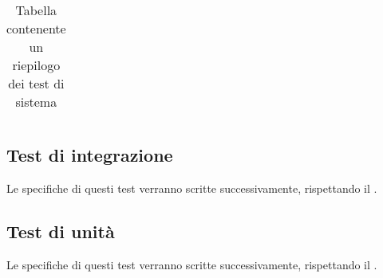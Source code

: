 \begin{center}
\begin{longtable}{|c|p{10cm}|c|}
			 \caption{Tabella contenente un riepilogo dei test di sistema}
			\end{longtable}
		\end{center}


	\subsection{Test di integrazione}
		Le specifiche di questi test verranno scritte successivamente, rispettando il . 

	\subsection{Test di unità}
	 	Le specifiche di questi test verranno scritte successivamente, rispettando il . 
